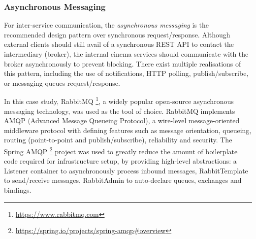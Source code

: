 \subsubsection{Asynchronous Messaging}

For inter-service communication, the \textit{asynchronous messaging} is the recommended design pattern over synchronous request/response. Although external clients should still avail of a synchronous REST API to contact the intermediary (broker), the internal cinema services should communicate with the broker asynchronously to prevent blocking. There exist multiple realisations of this pattern, including the use of notifications, HTTP polling, publish/subscribe, or messaging queues request/response.

In this case study, RabbitMQ \footnote{\url{https://www.rabbitmq.com}}, a widely popular open-source asynchronous messaging technology, was used as the tool of choice. RabbitMQ implements AMQP (Advanced Message Queueing Protocol), a wire-level message-oriented middleware protocol with defining features such as message orientation, queueing, routing (point-to-point and publish/subscribe), reliability and security. The Spring AMQP \footnote{\url{https://spring.io/projects/spring-amqp\#overview}} project was used to greatly reduce the amount of boilerplate code required for infrastructure setup, by providing high-level abstractions: a Listener container to asynchronously process inbound messages, RabbitTemplate to send/receive messages, RabbitAdmin to auto-declare queues, exchanges and bindings.

